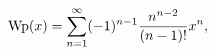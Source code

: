 \[\mathop{\mathrm{Wp}\/}\nolimits\!\left(x\right)=\sum_{n=1}^{\infty}(-1)^{n-1}%
\frac{n^{n-2}}{(n-1)!}x^{n},\]